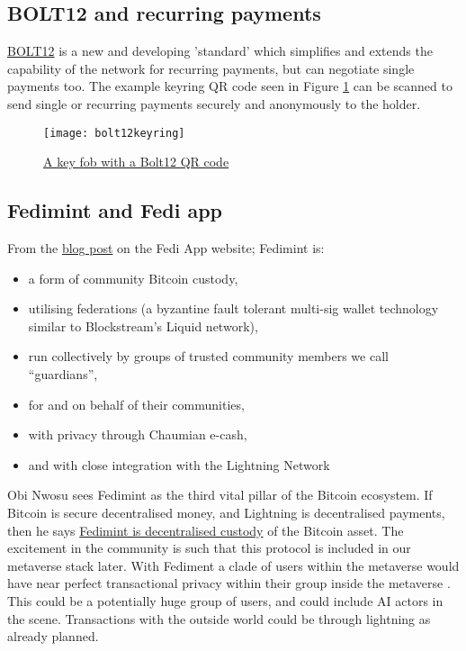 \subsection{BOLT12 and recurring payments}
\href{https://bolt12.org/}{BOLT12} is a new and developing 'standard' which simplifies and extends the capability of the network for recurring payments, but can negotiate single payments too. The example keyring QR code seen in Figure \ref{fig:bolt12keyring} can be scanned to send single or recurring payments securely and anonymously to the holder.
\begin{figure}
  \centering
    \texttt{[image: bolt12keyring]}
  \caption{\href{https://twitter.com/SeedMint21/status/1518934554840600579}{A key fob with a Bolt12 QR code}}
  \label{fig:bolt12keyring}
\end{figure}
\subsection{Fedimint and Fedi app}
From the \href{https://www.fedi.xyz/blog/introducing-fedi-the-global-bitcoin-adoption-technology}{blog post} on the Fedi App website; Fedimint is:
\begin{itemize}
\item a form of community Bitcoin custody,
\item utilising federations (a byzantine fault tolerant multi-sig wallet technology similar to Blockstream's Liquid network),
\item run collectively by groups of trusted community members we call “guardians”,
\item for and on behalf of their communities,
\item with privacy through Chaumian e-cash,
\item and with close integration with the Lightning Network
\end{itemize}
Obi Nwosu sees Fedimint as the third vital pillar of the Bitcoin ecosystem. If Bitcoin is secure decentralised money, and Lightning is decentralised payments, then he says \href{https://bitcoinmagazine.com/technical/fediment-evolution-of-bitcoin-custody}{Fedimint is decentralised custody} of the Bitcoin asset. The excitement in the community is such that this protocol is included in our metaverse stack later. With Fediment a clade of users within the metaverse would have near perfect transactional privacy within their group inside the metaverse \cite{chaum1985security}. This could be a potentially huge group of users, and could include AI actors in the scene. Transactions with the outside world could be through lightning as already planned.
